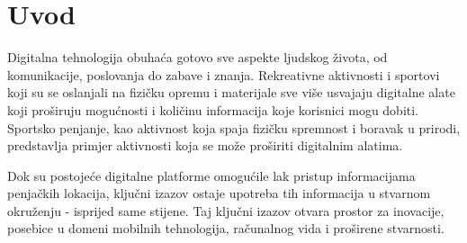 \chapter{Uvod}

Digitalna tehnologija obuhaća gotovo sve aspekte ljudskog života, od komunikacije, poslovanja do zabave i znanja. Rekreativne aktivnosti i sportovi koji su se oslanjali na fizičku opremu i materijale sve više usvajaju digitalne alate koji proširuju mogućnosti i količinu informacija koje korisnici mogu dobiti. Sportsko penjanje, kao aktivnost koja spaja fizičku spremnost i boravak u prirodi, predstavlja primjer aktivnosti koja se može proširiti digitalnim alatima.

Dok su postojeće digitalne platforme omogućile lak pristup informacijama penjačkih lokacija, ključni izazov ostaje upotreba tih informacija u stvarnom okruženju - isprijed same stijene. Taj ključni izazov otvara prostor za inovacije, posebice u domeni mobilnih tehnologija, računalnog vida i proširene stvarnosti.


% 
% 
